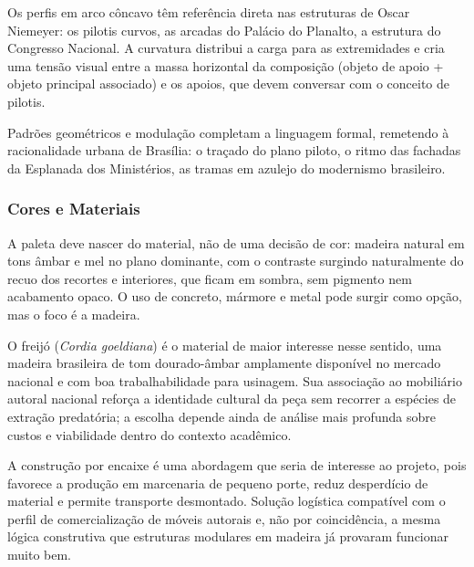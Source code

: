 \documentclass[
  12pt,
  a4paper,
  oneside,
  brazil
]{article}
\begin{document}
Os perfis em arco côncavo têm referência direta nas estruturas de Oscar
Niemeyer: os pilotis curvos, as arcadas do Palácio do Planalto, a estrutura
do Congresso Nacional. A curvatura distribui a carga para as extremidades e
cria uma tensão visual entre a massa horizontal da composição (objeto de apoio
+ objeto principal associado) e os apoios, que devem conversar com o conceito
de pilotis.

Padrões geométricos e modulação completam a linguagem formal, remetendo à
racionalidade urbana de Brasília: o traçado do plano piloto, o ritmo das
fachadas da Esplanada dos Ministérios, as tramas em azulejo do modernismo
brasileiro.

\subsubsection{Cores e Materiais}

A paleta deve nascer do material, não de uma decisão de cor: madeira natural
em tons âmbar e mel no plano dominante, com o contraste surgindo naturalmente
do recuo dos recortes e interiores, que ficam em sombra, sem pigmento nem
acabamento opaco. O uso de concreto, mármore e metal pode surgir como opção,
mas o foco é a madeira.

O freijó (\textit{Cordia goeldiana}) é o material de maior interesse nesse
sentido, uma madeira brasileira de tom dourado-âmbar amplamente disponível no
mercado nacional e com boa trabalhabilidade para usinagem. Sua associação ao
mobiliário autoral nacional reforça a identidade cultural da peça sem recorrer
a espécies de extração predatória; a escolha depende ainda de análise mais
profunda sobre custos e viabilidade dentro do contexto acadêmico.

A construção por encaixe é uma abordagem que seria de interesse ao projeto,
pois favorece a produção em marcenaria de pequeno porte, reduz desperdício de
material e permite transporte desmontado. Solução logística compatível com o
perfil de comercialização de móveis autorais e, não por coincidência, a mesma
lógica construtiva que estruturas modulares em madeira já provaram funcionar
muito bem.
\end{document}
